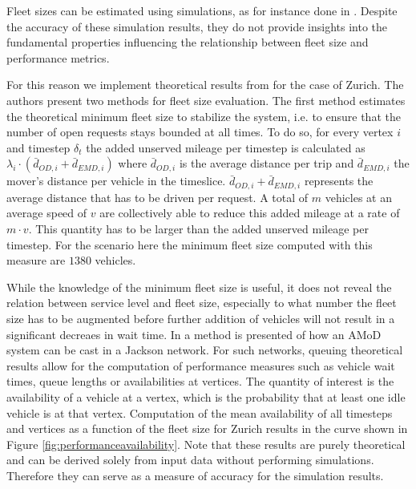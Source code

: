 Fleet sizes can be estimated using simulations, as for instance done in
\citep{bischoff2016simulation}. Despite the accuracy of these
simulation results, they do not provide insights into the fundamental
properties influencing the relationship between fleet size and performance metrics.

For this reason we implement theoretical results from \citep{spieser2014toward}
for the case of Zurich. The authors present two methods for fleet size evaluation.
The first method estimates the theoretical minimum fleet size to stabilize
the system, i.e. to ensure that the number of open requests stays bounded at
all times. To do so, for every vertex $i$ and timestep $\delta_t$ the added
unserved mileage per timestep is calculated as
$\lambda_i \cdot ( \bar{d}_{OD,i}  + \bar{d}_{EMD,i})$ where $\bar{d}_{OD,i}$
is the average distance per trip and  $\bar{d}_{EMD,i}$ the mover's
distance per vehicle in the timeslice. $\bar{d}_{OD,i}  + \bar{d}_{EMD,i}$
represents the average distance that has to be driven per request. A total of
$m$ vehicles at an average speed of $v$ are collectively able to reduce this
 added mileage at a rate of $m \cdot v$. This quantity has to be larger than the
 added unserved mileage per timestep. For the scenario here the
 minimum fleet size computed with this measure are $1380$ vehicles.

While the knowledge of the minimum fleet size is useful, it does not reveal
the relation between service level and fleet size, especially to what number
the fleet size has to be augmented before further addition of vehicles will
not result in a significant decreaes in wait time. In \citep{zhang2016control}
 a method is presented of how an AMoD system can be cast in a Jackson network.
 For such networks, queuing theoretical results allow for the computation of
 performance measures such as vehicle wait times, queue lengths or
 availabilities at vertices. The quantity of interest is the availability
 of a vehicle at a vertex, which is the probability that at least one idle
 vehicle is at that vertex. Computation of the mean availability of all
 timesteps and vertices as a function of the fleet size for Zurich results
 in the curve shown in Figure \ref{fig:performanceavailability}. Note that these results
 are purely theoretical and can be derived solely from input data without performing simulations.
 Therefore they can serve as a measure of accuracy for the simulation results.
